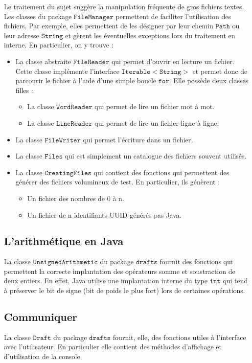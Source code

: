 \documentclass[12pt,a4paper,titlepage]{article}
\newcommand{\class}[1]{$\mathtt{#1}$}
\begin{document}
Le traitement du sujet suggère la manipulation fréquente de gros fichiers textes.\\
Les classes du package \class{FileManager} permettent de faciliter l'utilisation des fichiers. Par exemple, elles permettent de les désigner par leur chemin \class{Path} ou leur adresse \class{String} et gèrent les éventuelles exceptions lors du traitement en interne. En particulier, on y trouve :
\begin{itemize}
\item La classe abstraite \class{FileReader} qui permet d'ouvrir en lecture un fichier.\\
	Cette classe implémente l'interface \class{Iterable<String>} et permet donc de parcourir le fichier à l'aide d'une simple boucle \class{for}.
	Elle possède deux classes filles :
	\begin{itemize}
	\item La classe \class{WordReader} qui permet de lire un fichier mot à mot.
	\item La classe \class{LineReader} qui permet de lire un fichier ligne à ligne.
	\end{itemize}
\item La classe \class{FileWriter} qui permet l'écriture dans un fichier.
\item La classe \class{Files} qui est simplement un catalogue des fichiers souvent utilisés.
\item La classe \class{CreatingFiles} qui contient des fonctions qui permettent des générer des fichiers volumineux de test. En particulier, ils génèrent :
	\begin{itemize}
	\item Un fichier des nombres de 0 à n.
	\item Un fichier de n identifiants UUID générés pas Java.
	\end{itemize}
\end{itemize}

\subsection*{L'arithmétique en Java}
La classe \class{UnsignedArithmetic} du package \class{drafts} fournit des fonctions qui permettent la correcte implantation des opérateurs somme et soustraction de deux entiers. En effet, Java utilise une implantation interne du type \class{int} qui tend à préserver le bit de signe (bit de poids le plus fort) lors de certaines opérations.

\subsection*{Communiquer}
La classe \class{Draft} du package \class{drafts} fournit, elle, des fonctions utiles à l'interface avec l'utilisateur. En particulier elle contient des méthodes d'affichage et d'utilisation de la console.
\end{document}
